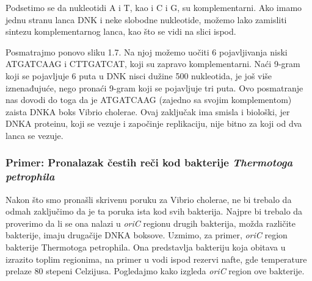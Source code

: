 Podsetimo se da nukleotidi A i T, kao i C i G, su komplementarni. Ako imamo jednu stranu lanca DNK i neke slobodne nukleotide, možemo lako zamisliti sintezu komplementarnog lanca, kao što se vidi na slici ispod. 

Posmatrajmo ponovo sliku 1.7. Na njoj možemo uočiti 6 pojavljivanja niski ATGATCAAG i CTTGATCAT, koji su zapravo komplementarni. Naći 9-gram koji se pojavljuje 6 puta u DNK nisci dužine 500 nukleotida, je još više iznenađujuće, nego pronaći 9-gram koji se pojavljuje tri puta. Ovo posmatranje nas dovodi do toga da je ATGATCAAG (zajedno sa svojim komplementom) zaista DNKA boks Vibrio cholerae. Ovaj zaključak ima smisla i biološki, jer DNKA proteinu, koji se vezuje i započinje replikaciju, nije bitno za koji od dva lanca se vezuje.

\subsubsection{Primer: Pronalazak čestih reči kod bakterije \textit{Thermotoga petrophila}} 

Nakon što smo pronašli skrivenu poruku za Vibrio cholerae, ne bi trebalo da odmah zaključimo da je ta poruka ista kod svih bakterija. Najpre bi trebalo da proverimo da li se ona nalazi u \textit{oriC} regionu drugih bakterija, možda različite bakterije, imaju drugačije DNKA boksove. Uzmimo, za primer, \textit{oriC} region bakterije Thermotoga petrophila. Ona predstavlja bakteriju koja obitava u izrazito toplim regionima, na primer u vodi ispod rezervi nafte, gde temperature prelaze 80 stepeni Celzijusa. Pogledajmo kako izgleda \textit{oriC} region ove bakterije.

